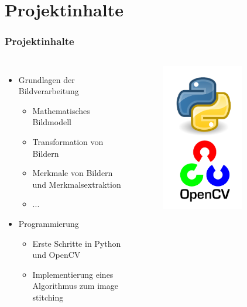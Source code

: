 \documentclass[aspectratio=43, 11pt]{beamer}
\begin{document}
  \section{Projektinhalte}

    \begin{frame}
      \frametitle{Projektinhalte}
			\begin{columns}
		      \begin{itemize}
  		      \item Grundlagen der Bildverarbeitung
    		      \begin{itemize}
      		      \item Mathematisches Bildmodell
      	  	    \item Transformation von Bildern
          		  \item Merkmale von Bildern und Merkmalsextraktion
	          	  \item ...
	  	        \end{itemize}
  	  	    \item Programmierung
    	      	\begin{itemize}
	   		  	  \item Erste Schritte in Python und OpenCV
							\item Implementierung eines Algorithmus zum image stitching
    	    	\end{itemize}
		      \end{itemize}
					\begin{figure}
						\includegraphics[width=0.7\textwidth]{python_and_opencv}
					\end{figure}
			\end{columns}
    \end{frame}
\end{document}
